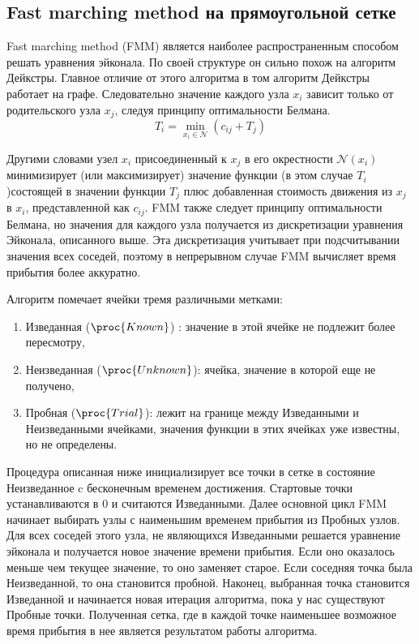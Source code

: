 \subsection{Fast marching method на прямоугольной сетке}
\label{sec:fast-marching-method}

Fast marching method (FMM) \cite{S1999} является наиболее
распространенным способом решать уравнения эйконала. По своей
структуре он сильно похож на алгоритм Дейкстры. Главное отличие от
этого алгоритма в том алгоритм Дейкстры работает на
графе. Следовательно значение каждого узла $x_i$ зависит только от
родительского узла ${x_j}$, следуя принципу оптимальности Белмана.
\begin{equation*}
  T_i = \min_{x_i\in \mathcal{N}} (c_{ij} + T_j)
\end{equation*}

Другими словами узел $x_i$ присоединенный к $x_j$ в его
окрестности $\mathcal{N}(x_i)$ минимизирует (или
максимизирует) значение функции (в этом случае $T_i$)состоящей в
значении функции $T_j$ плюс добавленная стоимость движения из $x_j$ в
$x_i$, представленной как $c_{ij}$.
FMM также следует принципу оптимальности Белмана, но значения для
каждого узла получается из дискретизации уравнения Эйконала,
описанного выше. Эта дискретизация учитывает при подсчитывании
значения всех соседей, поэтому в непрерывном случае FMM вычисляет
время прибытия более аккуратно.

Алгоритм помечает ячейки тремя различными метками:
\begin{enumerate}
\item Изведанная ($\proc{Known}$) : значение в этой ячейке не подлежит более
  пересмотру,
\item Неизведанная ($\proc{Unknown}$): ячейка, значение в которой еще не
  получено,
\item Пробная ($\proc{Trial}$): лежит на границе между Изведанными
  и Неизведанными ячейками, значения функции в этих ячейках
  уже известны, но не определены.
\end{enumerate}

Процедура описанная ниже инициализирует все точки в сетке в состояние
Неизведанное c бесконечным временем достижения. Стартовые
точки устанавливаются в $0$ и считаются Изведанными. Далее основной
цикл FMM начинает выбирать узлы с наименьшим временем прибытия из
Пробных узлов. Для всех соседей этого узла, не являющихся
Изведанными решается уравнение эйконала и получается новое
значение времени прибытия. Если оно оказалось меньше чем текущее
значение, то оно заменяет старое. Если соседняя точка была
Неизведанной, то она становится пробной. Наконец, выбранная
точка становится Изведанной и начинается новая итерация
алгоритма, пока у нас существуют Пробные точки. Полученная
сетка, где в каждой точке наименьшее возможное время прибытия в нее
является результатом работы алгоритма.

